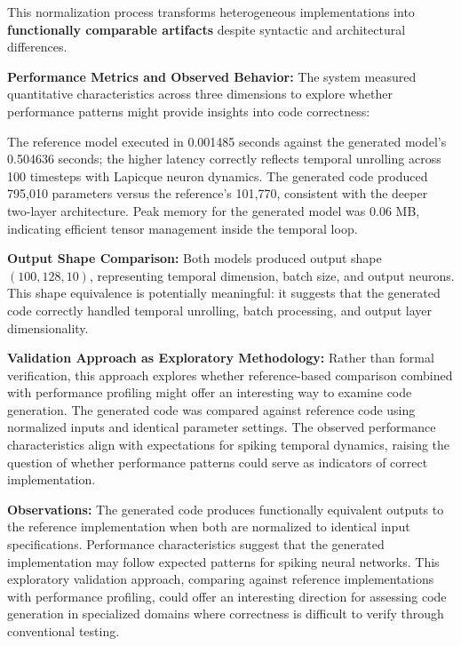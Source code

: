 This normalization process transforms heterogeneous implementations into \textbf{functionally comparable artifacts} despite syntactic and architectural differences.

\vspace{0.3cm}

\noindent \textbf{Performance Metrics and Observed Behavior:} The system measured quantitative characteristics across three dimensions to explore whether performance patterns might provide insights into code correctness:

The reference model executed in 0.001485 seconds against the generated model's 0.504636 seconds; the higher latency correctly reflects temporal unrolling across 100 timesteps with Lapicque neuron dynamics. The generated code produced 795,010 parameters versus the reference's 101,770, consistent with the deeper two-layer architecture. Peak memory for the generated model was 0.06 MB, indicating efficient tensor management inside the temporal loop.

\vspace{0.3cm}

\noindent \textbf{Output Shape Comparison:} Both models produced output shape \( (100, 128, 10) \), representing temporal dimension, batch size, and output neurons. This shape equivalence is potentially meaningful: it suggests that the generated code correctly handled temporal unrolling, batch processing, and output layer dimensionality.

\vspace{0.3cm}

\noindent \textbf{Validation Approach as Exploratory Methodology:} Rather than formal verification, this approach explores whether reference-based comparison combined with performance profiling might offer an interesting way to examine code generation. The generated code was compared against reference code using normalized inputs and identical parameter settings. The observed performance characteristics align with expectations for spiking temporal dynamics, raising the question of whether performance patterns could serve as indicators of correct implementation.

\vspace{0.3cm}

\noindent \textbf{Observations:} The generated code produces functionally equivalent outputs to the reference implementation when both are normalized to identical input specifications. Performance characteristics suggest that the generated implementation may follow expected patterns for spiking neural networks. This exploratory validation approach, comparing against reference implementations with performance profiling, could offer an interesting direction for assessing code generation in specialized domains where correctness is difficult to verify through conventional testing.



